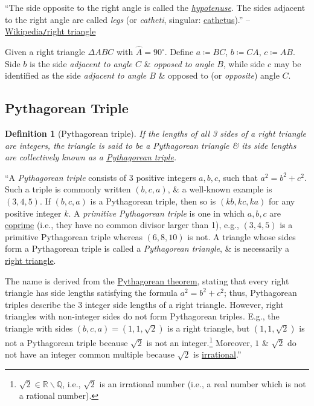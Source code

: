 \documentclass{article}
\newtheorem{definition}{Definition}
\begin{document}
``The side opposite to the right angle is called the \href{https://en.wikipedia.org/wiki/Hypotenuse}{\textit{hypotenuse}}. The sides adjacent to the right angle are called \textit{legs} (or \textit{catheti}, singular: \href{https://en.wikipedia.org/wiki/Cathetus}{cathetus}).'' -- \href{https://en.wikipedia.org/wiki/Right_triangle}{Wikipedia{\tt/}right triangle}

Given a right triangle $\Delta ABC$ with $\widehat A = 90^\circ$. Define $a\coloneqq BC$, $b\coloneqq CA$, $c\coloneqq AB$. Side $b$ is the side \textit{adjacent to angle $C$} \& \textit{opposed to angle $B$}, while side $c$ may be identified as the side \textit{adjacent to angle $B$} \& opposed to (or \textit{opposite}) angle $C$.

\subsection{Pythagorean Triple}

\begin{definition}[Pythagorean triple]
	If the lengths of all 3 sides of a right triangle are integers, the triangle is said to be a {\rm Pythagorean triangle} \& its side lengths are collectively known as a \href{https://en.wikipedia.org/wiki/Pythagorean_triple}{\rm Pythagorean triple}.
\end{definition}
``A \textit{Pythagorean triple} consists of 3 positive integers $a,b,c$, such that $a^2 = b^2 + c^2$. Such a triple is commonly written $(b,c,a)$, \& a well-known example is $(3,4,5)$. If $(b,c,a)$ is a Pythagorean triple, then so is $(kb,kc,ka)$ for any positive integer $k$. A \textit{primitive Pythagorean triple} is one in which $a,b,c$ are \href{https://en.wikipedia.org/wiki/Coprime}{coprime} (i.e., they have no common divisor larger than 1), e.g., $(3,4,5)$ is a primitive Pythagorean triple whereas $(6,8,10)$ is not. A triangle whose sides form a Pythagorean triple is called a \textit{Pythagorean triangle}, \& is necessarily a \href{https://en.wikipedia.org/wiki/Right_triangle}{right triangle}.

The name is derived from the \href{https://en.wikipedia.org/wiki/Pythagorean_theorem}{Pythagorean theorem}, stating that every right triangle has side lengths satisfying the formula $a^2 = b^2 + c^2$; thus, Pythagorean triples describe the 3 integer side lengths of a right triangle. However, right triangles with non-integer sides do not form Pythagorean triples. E.g., the triangle with sides $(b,c,a) = (1,1,\sqrt{2})$ is a right triangle, but $(1,1,\sqrt{2})$ is not a Pythagorean triple because $\sqrt{2}$ is not an integer.\footnote{$\sqrt{2}\in\mathbb{R}\backslash\mathbb{Q}$, i.e., $\sqrt{2}$ is an irrational number (i.e., a real number which is not a rational number).} Moreover, $1$ \& $\sqrt{2}$ do not have an integer common multiple because $\sqrt{2}$ is \href{https://en.wikipedia.org/wiki/Irrational_number#History}{irrational}.''
\end{document}
